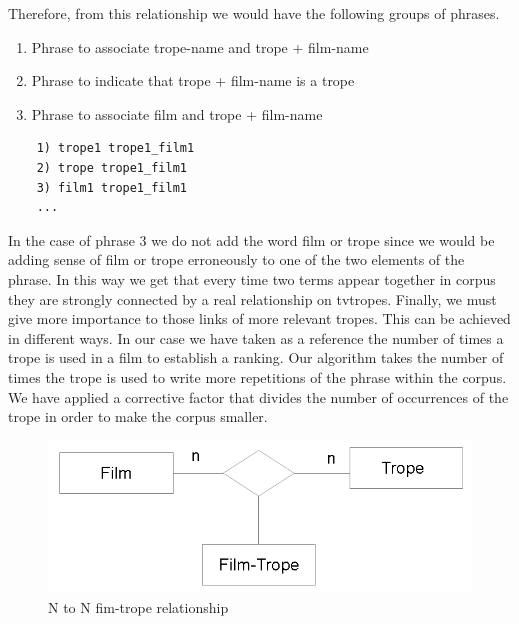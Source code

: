 \documentclass[letterpaper]{article}
\begin{document}
	Therefore, from this relationship we would have the following groups of phrases.
	\begin{enumerate}
		\item Phrase to associate trope-name and trope + film-name
		\item Phrase to indicate that trope + film-name is a trope
		\item Phrase to associate film and trope + film-name 
	\end{enumerate}     
	
		\begin{verbatim}
	1) trope1 trope1_film1
	2) trope trope1_film1
	3) film1 trope1_film1
	...		
	\end{verbatim}
	
	In the case of phrase 3 we do not add the word film or trope since we would be adding sense of film or trope erroneously to one of the two elements of the phrase.
	In this way we get that every time two terms appear together in corpus they are strongly connected by a real relationship on tvtropes. Finally, we must give more importance to those links of more relevant tropes. This can be achieved in different ways. In our case we have taken as a reference the number of times a trope is used in a film to establish a ranking. Our algorithm takes the number of times the trope is used to write more repetitions of the phrase within the corpus. We have applied a corrective factor that divides the number of occurrences of the trope in order to make the corpus smaller.
	
		\begin{figure}
		\centering
		\includegraphics[width=1\linewidth]{../images/trope-film-n-to-n.png}
		\caption{N to N fim-trope relationship}
		\label{fig:film-trope-relationship}
	\end{figure}
	
	
\end{document}
